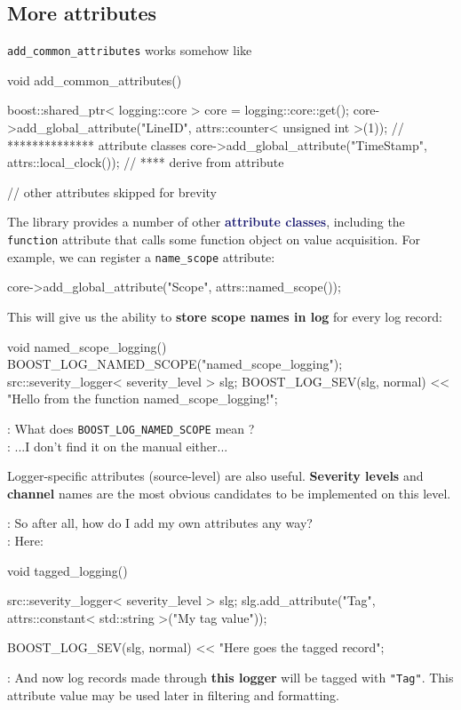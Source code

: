 \documentclass[dvipsnames]{article}
\newcommand{\mycola}{MidnightBlue}
\newcommand{\Cola}[1]{\textcolor{\mycola}{\textbf{#1}}}
\begin{document}
\subsection{More attributes}

\verb|add_common_attributes| works somehow like
\begin{simplec}
  void add_common_attributes(){
    boost::shared_ptr< logging::core > core = logging::core::get();
    core->add_global_attribute("LineID", attrs::counter< unsigned int >(1));
    //                                   ************** attribute classes
    core->add_global_attribute("TimeStamp", attrs::local_clock());
    //                                      **** derive from attribute

    // other attributes skipped for brevity
  }
\end{simplec}
The library provides a number of other \Cola{attribute classes}, including the
\texttt{function} attribute that calls some function object on value
acquisition. For example, we can register a \texttt{name\_scope} attribute:
\begin{simplec}
  core->add_global_attribute("Scope", attrs::named_scope());
\end{simplec}
This will give us the ability to \textbf{store scope names in log} for every log
record:
\begin{simplec}
  void named_scope_logging(){
    BOOST_LOG_NAMED_SCOPE("named_scope_logging");
    src::severity_logger< severity_level > slg;
    BOOST_LOG_SEV(slg, normal) << "Hello from the function
    named_scope_logging!";
  }
\end{simplec}
\begin{tcolorbox}
   : What does \verb|BOOST_LOG_NAMED_SCOPE| mean ?\\
   : ...I don't find it on the manual either...
\end{tcolorbox}

Logger-specific attributes (source-level) are also useful. \textbf{Severity
  levels} and \textbf{channel} names are the most obvious candidates to be
implemented on this level.

\begin{tcolorbox}
   : So after all, how do I add my own attributes any way?\\
   : Here:
\end{tcolorbox}
\begin{simplec}
  void tagged_logging(){
    src::severity_logger< severity_level > slg;
    slg.add_attribute("Tag", attrs::constant< std::string >("My tag value"));

    BOOST_LOG_SEV(slg, normal) << "Here goes the tagged record";
  }
\end{simplec}
 : And now log records made through \textbf{this logger} will be
tagged with \texttt{"Tag"}. This attribute value may be used later in filtering
and formatting.
\end{document}
